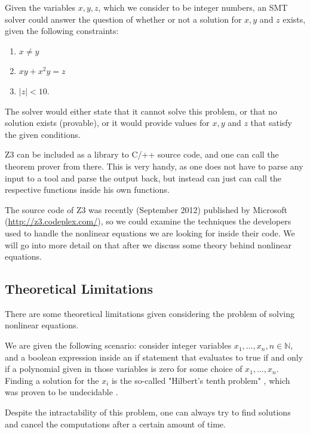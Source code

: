 \documentclass[oribibl, twocolumn]{llncs}
\newcommand{\NN}{{\mathbb{N}}}
\begin{document}
\begin{example}
  Given the variables $x,y,z$, which we consider to
  be integer numbers, an SMT solver could answer the question of whether or not
  a solution for $x,y$ and $z$ exists, given the following
  constraints:
  \begin{enumerate}
    \item $x \neq y$
    \item $xy+x^2y=z$
    \item $|z|<10$.
  \end{enumerate}
  The solver would either state that it cannot solve this problem, or
  that no solution exists (provable), or it would provide values for
  $x,y$ and $z$ that satisfy the given conditions.
\end{example}

\textsc{Z3} can be included as a library to \textsc{C}/\textsc{++} source code, and one
can call the theorem prover from there. This is very handy, as one does
not have to parse any input to a tool and parse the output back, but instead can
just can call the respective functions inside his own functions.

The source code of \textsc{Z3} was recently (September 2012) published
by Microsoft (\url{http://z3.codeplex.com/}), so we could examine the
techniques the developers used to handle the nonlinear equations we
are looking for inside their code. We will go into more detail on that
after we discuss some theory behind nonlinear equations.

\subsection{Theoretical Limitations}

There are some theoretical limitations given considering the problem
of solving nonlinear equations.

We are given the following scenario: consider integer variables $x_1, \ldots,
x_n, n \in \NN$, and a boolean expression inside an if statement that
evaluates to true if and only if a polynomial given in those variables
is zero for some choice of $x_1, \ldots, x_n$. Finding a solution for
the $x_i$ is the so-called "Hilbert's tenth problem"
\cite{davis1984hilbert}, which was proven to be undecidable
\cite{matiyasevich1970enumerable}.

Despite the intractability of this problem, one can always try to find solutions and cancel the
computations after a certain amount of time.
\end{document}
